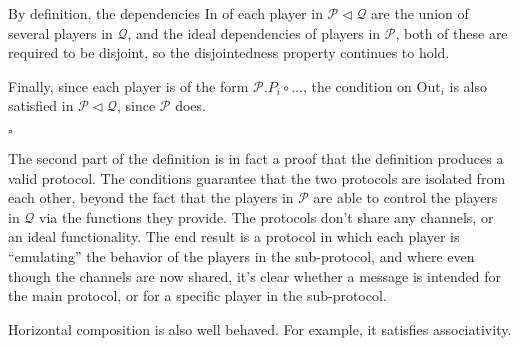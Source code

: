 \begin{definition}
By definition, the dependencies $\text{In}$ of each player in $\mathscr{P} \lhd \mathscr{Q}$
are the union of several players in $\mathscr{Q}$, and
the ideal dependencies of players in $\mathscr{P}$,
both of these are required to be disjoint, so the disjointedness property
continues to hold.

Finally, since each player is of the form $\mathscr{P}.P_i \circ \ldots$,
the condition on $\text{Out}_i$ is also satisfied in $\mathscr{P} \lhd \mathscr{Q}$,
since $\mathscr{P}$ does.

$\square$

\end{definition}

The second part of the definition is in fact a proof that the definition
produces a valid protocol.
The conditions guarantee that the two protocols are isolated
from each other, beyond the fact that the players in $\mathscr{P}$
are able to control the players in $\mathscr{Q}$ via the functions they provide.
The protocols don't share any channels, or an ideal functionality.
The end result is a protocol in which each player
is ``emulating'' the behavior of the players in the sub-protocol,
and where even though the channels are now shared, it's clear
whether a message is intended for the main protocol,
or for a specific player in the sub-protocol.

Horizontal composition is also well behaved.
For example, it satisfies associativity.

